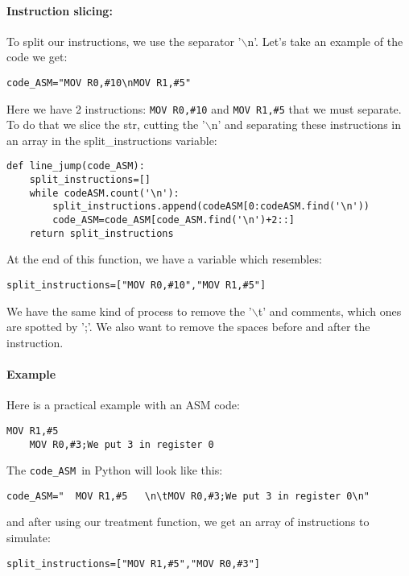 \documentclass{article}
\newcommand{\code}[1]{\fontfamily{zi4}\texttt{#1}}
\newcommand{\codeASM}[0]{\code{code\_ASM }}
\newcommand{\n}[0]{\(\backslash\)n}
\begin{document}
\paragraph{Instruction slicing:}
To split our instructions, we use the separator '\n'. Let's take an example of the code we get:
\begin{lstlisting}[language=MyPython]
code_ASM="MOV R0,#10\nMOV R1,#5"
\end{lstlisting}
Here we have 2 instructions: \code{MOV~R0,\#10} and \code{MOV~R1,\#5} that we must separate. To do that we slice the str, cutting the '\n' and separating these instructions in an array in the split\_instructions variable:
\begin{lstlisting}[language=MyPython]
def line_jump(code_ASM):
    split_instructions=[]
    while codeASM.count('\n'):
        split_instructions.append(codeASM[0:codeASM.find('\n'))
        code_ASM=code_ASM[code_ASM.find('\n')+2::]
    return split_instructions
\end{lstlisting}
At the end of this function, we have a variable which resembles:
\begin{lstlisting}[language=MyPython]
split_instructions=["MOV R0,#10","MOV R1,#5"]
\end{lstlisting}
We have the same kind of process to remove the '\(\backslash\)t' and comments, which ones are spotted by ';'. We also want to remove the spaces before and after the instruction.
\paragraph{Example} Here is a practical example with an ASM code:
\begin{lstlisting}[language=MyASM]
  MOV R1,#5   
    MOV R0,#3;We put 3 in register 0
\end{lstlisting}
The \codeASM in Python will look like this:
\begin{lstlisting}[language=MyPython]
code_ASM="  MOV R1,#5   \n\tMOV R0,#3;We put 3 in register 0\n"
\end{lstlisting}
and after using our treatment function, we get an array of instructions to simulate:
\begin{lstlisting}[language=MyPython]
split_instructions=["MOV R1,#5","MOV R0,#3"]
\end{lstlisting}
\end{document}
